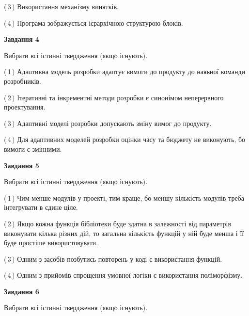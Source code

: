 \documentclass[10pt, ukrainian]{article}
\begin{document}
{\begin {large}
(\,3\,) Використання механізму винятків. %



(\,4\,) Програма зображується ієрархічною структурою блоків.%


{\begin {center}\textbf{Завдання 4}\end {center}}\par
Вибрати всі істинні твердження (якщо існують).\par
\vspace{2mm}



(\,1\,) Адаптивна модель розробки адаптує вимоги до продукту до наявної команди розробників. %



(\,2\,) Ітеративні та інкрементні методи розробки є синонімом неперервного проектування. %



(\,3\,) Адаптивні моделі розробки допускають зміну вимог до продукту. %



(\,4\,) Для адаптивних моделей розробки оцінки часу та бюджету не виконують, бо вимоги є змінними. %


{\begin {center}\textbf{Завдання 5}\end {center}}\par
Вибрати всі істинні твердження (якщо існують).\par
\vspace{2mm}



(\,1\,) Чим менше модулів у проекті, тим краще, бо меншу кількість модулів треба інтегрувати в єдине ціле. %



(\,2\,) Якщо кожна функція бібліотеки буде здатна в залежності від параметрів виконувати кілька різних дій, то загальна кількість функцій у ній буде менша і її буде простіше використовувати. %



(\,3\,) Одним з засобів позбутись повторень у коді є використання функцій. %



(\,4\,) Одним з прийомів спрощення умовної логіки є використання поліморфізму. %

\newpage

{\begin {center}\textbf{Завдання 6}\end {center}}\par
Вибрати всі істинні твердження (якщо існують).\par
\vspace{2mm}




\end{large}}
\end{document}
